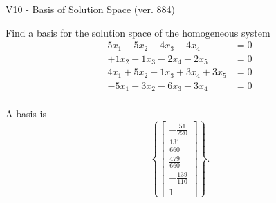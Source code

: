 \begin{exercise}
  \begin{exerciseTitle}V10 - Basis of Solution Space (ver. 884)\end{exerciseTitle}
  \begin{exerciseStatement}
    Find a basis for the solution space of the homogeneous system 
\begin{align*}
 5 x_ 1 -5 x_ 2 -4 x_ 3 -4 x_ 4 &= 0  \\ 
  + 1 x_ 2 -1 x_ 3 -2 x_ 4 -2 x_ 5 &= 0  \\ 
  4 x_ 1 + 5 x_ 2 + 1 x_ 3 + 3 x_ 4 + 3 x_ 5 &= 0  \\ 
  -5 x_ 1 -3 x_ 2 -6 x_ 3 -3 x_ 4 &= 0  \\ 
 \end{align*}


 
  \end{exerciseStatement}

  \begin{exerciseAnswer}
   A basis is   
\[\left\{\left[\begin{array}{c}
-\frac{51}{220} \\
\frac{131}{660} \\
\frac{479}{660} \\
-\frac{139}{110} \\
1
\end{array}\right]\right\}.\]

  


  \end{exerciseAnswer}
\end{exercise}
